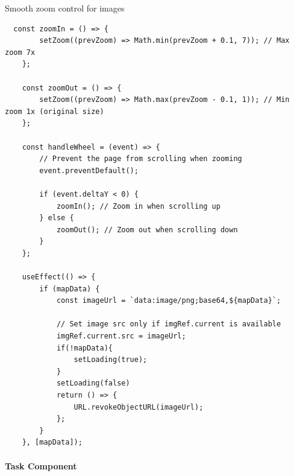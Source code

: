 \documentclass[../../main]{subfiles}
\begin{document}
\begin{codebox}[]{Smooth zoom control for images}
  
  \begin{verbatim}
  const zoomIn = () => {
        setZoom((prevZoom) => Math.min(prevZoom + 0.1, 7)); // Max zoom 7x
    };

    const zoomOut = () => {
        setZoom((prevZoom) => Math.max(prevZoom - 0.1, 1)); // Min zoom 1x (original size)
    };

    const handleWheel = (event) => {
        // Prevent the page from scrolling when zooming
        event.preventDefault();
        
        if (event.deltaY < 0) {
            zoomIn(); // Zoom in when scrolling up
        } else {
            zoomOut(); // Zoom out when scrolling down
        }
    };

    useEffect(() => {
        if (mapData) {
            const imageUrl = `data:image/png;base64,${mapData}`;

            // Set image src only if imgRef.current is available
            imgRef.current.src = imageUrl;
            if(!mapData){
                setLoading(true);
            }
            setLoading(false)
            return () => {
                URL.revokeObjectURL(imageUrl);
            };
        }
    }, [mapData]);

\end{verbatim}
\end{codebox}



\paragraph{Task Component}
\end{document}
